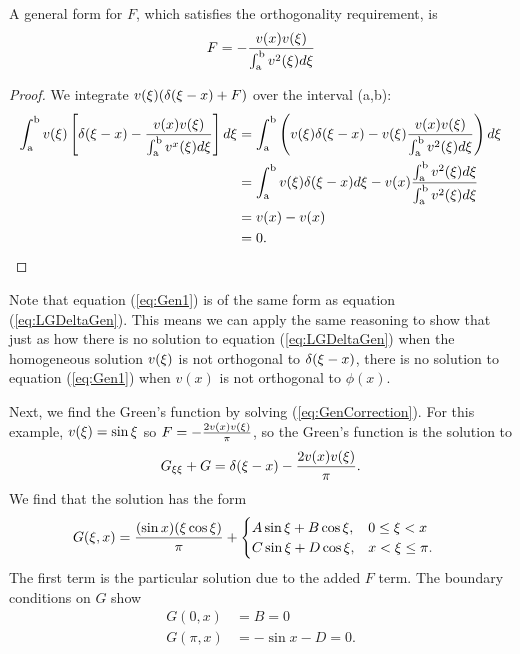     \begin{theorem}
        A general form for \(F\), which satisfies the orthogonality requirement, is
    \begin{equation*}
        F=-\frac{v(x)v(\xi)}{\int_{\mathrm{a}}^{\mathrm{b}}v^2(\xi)d\xi}
    \end{equation*}
    \end{theorem}
    \begin{proof}
        We integrate \(v(\xi)(\delta(\xi-x)+F)\) over the interval (a,b):
        \begin{equation*}
            \begin{split}
                \int_\mathrm{a}^\mathrm{b} v(\xi)\left[\delta(\xi-x) - \frac{v(x)v(\xi)}{\int_{\mathrm{a}}^{\mathrm{b}}v^x(\xi)d\xi} \right]d\xi &= \int_\mathrm{a}^\mathrm{b} \left(v(\xi)\delta(\xi-x) - v(\xi)\frac{v(x)v(\xi)}{\int_{\mathrm{a}}^{\mathrm{b}}v^2(\xi)d\xi} \right)d\xi \\
                &=\int_\mathrm{a}^\mathrm{b} v(\xi)\delta(\xi-x)d\xi - v(x)\frac{\int_{\mathrm{a}}^{\mathrm{b}}v^2(\xi)d\xi}{\int_{\mathrm{a}}^{\mathrm{b}}v^2(\xi)d\xi}\\
                &= v(x)-v(x)\\
                &=0.
            \end{split}
        \end{equation*}
    \end{proof}

    Note that equation (\ref{eq:Gen1}) is of the same form as equation (\ref{eq:LGDeltaGen}). This means we can apply the same reasoning to show that just as how there is no solution to equation (\ref{eq:LGDeltaGen}) when the homogeneous solution \(v(\xi)\) is not orthogonal to \(\delta(\xi-x)\), there is no solution to equation (\ref{eq:Gen1}) when \(v(x)\) is not orthogonal to \(\phi(x)\). 

    Next, we find the Green's function by solving (\ref{eq:GenCorrection}). For this example, \(v(\xi)= \sin \xi\) so \(F=-\frac{2 v(x)v(\xi)}{\pi}\), so the Green's function is the solution to
    \begin{equation*}
        G_{\xi\xi} + G = \delta(\xi-x) - \frac{2 v(x)v(\xi)}{\pi}.
    \end{equation*}
    We find that the solution has the form
    \begin{equation*}
        \begin{split}
            G(\xi, x) &= \frac{(\sin x)(\xi\cos \xi)}{\pi} + \begin{cases}
                A\sin\xi + B\cos\xi, & 0\leq\xi < x\\
                C\sin\xi + D\cos\xi, & x < \xi \leq \pi. 
            \end{cases}
        \end{split}
    \end{equation*}
    The first term is the particular solution due to the added \(F\) term. The boundary conditions on \(G\) show 
    \begin{equation}\label{eq:genBoundarySln}
        \begin{split}
            G(0,x) &= B = 0\\
            G(\pi,x) &= -\sin x - D = 0.
        \end{split}
    \end{equation}

